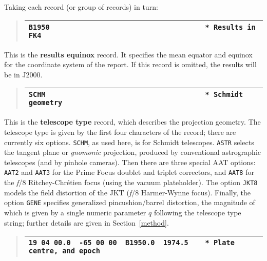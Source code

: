 \documentclass[twoside,11pt]{article}
\renewcommand{\_}{\texttt{\symbol{95}}}
\begin{document}
Taking each record (or group of records) in turn:

\begin{quote}
\begin{tabular}{|l|}
\hline
\verb|B1950                                     * Results in FK4| \\
\hline
\end{tabular}
\end{quote}

This is the \textbf{results equinox} record.  It specifies the mean
equator and equinox for the coordinate system of the report.  If this
record is omitted, the results will be in J2000.

\goodbreak
\begin{quote}
\begin{tabular}{|l|}
\hline
\verb|SCHM                                      * Schmidt geometry| \\
\hline
\end{tabular}
\end{quote}

This is the \textbf{telescope type} record, which describes the projection
geometry.  The telescope type is given by the first four characters of
the record;  there are currently six options.  \texttt{SCHM}, as used
here, is for Schmidt telescopes.  \texttt{ASTR} selects the tangent
plane or \textit{gnomonic} projection, produced by conventional
astrographic telescopes (and by pinhole cameras).  Then there are
three special AAT options: \texttt{AAT2} and \texttt{AAT3} for the
Prime Focus doublet and triplet correctors, and \texttt{AAT8} for the
\textit{f}/8 Ritchey-Chr\'etien focus (using the vacuum plateholder).
The option \texttt{JKT8} models the field distortion of the JKT
(\textit{f}/8 Harmer-Wynne focus).  Finally, the option \texttt{GENE}
specifies generalized pincushion/barrel distortion, the magnitude of
which is given by a single numeric parameter $q$ following the telescope
type string; further details are given in Section~\ref{method}.

\goodbreak
\begin{quote}
\begin{tabular}{|l|}
\hline
\verb|19 04 00.0  -65 00 00  B1950.0  1974.5    * Plate centre, and epoch| 
\\
\hline
\end{tabular}
\end{quote}
\end{document}
